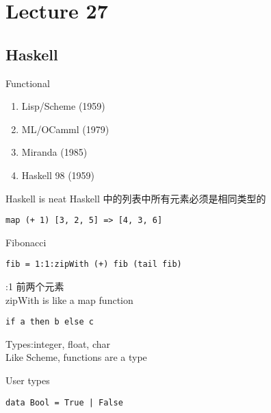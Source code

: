 \documentclass{article}
\begin{document}
\section{Lecture 27}
\subsection{Haskell}
Functional
\begin{enumerate}
	\item Lisp/Scheme (1959)
	\item ML/OCamml (1979)
	\item Miranda (1985)
	\item Haskell 98 (1959)
\end{enumerate}
Haskell is neat
Haskell 中的列表中所有元素必须是相同类型的
\begin{verbatim}
map (+ 1) [3, 2, 5] => [4, 3, 6]
\end{verbatim}

Fibonacci
\begin{verbatim}
fib = 1:1:zipWith (+) fib (tail fib)
\end{verbatim}

\bigskip{}:1 前两个元素\\
zipWith is like a map function

\begin{verbatim}
if a then b else c
\end{verbatim}

\bigskip\noindent
Types:integer, float, char\\
Like Scheme, functions are a type

User types
\begin{verbatim}
data Bool = True | False
\end{verbatim}
\end{document}
